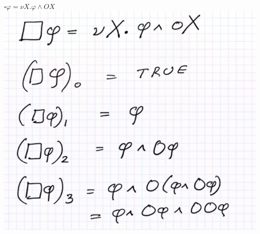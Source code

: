 \documentclass[../598comp.tex]{subfiles}
\begin{document}
\\\\
$\square \varphi = \nu X. \varphi \wedge OX$
\\
\includegraphics[width=\textwidth]{boxphi_breakdown.png}
\end{document}
